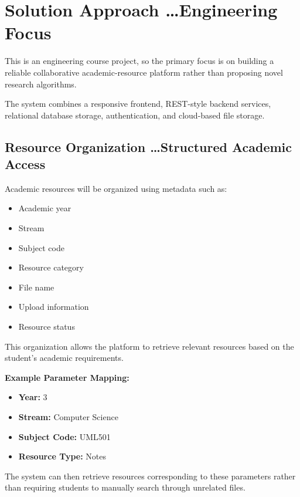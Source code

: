 \documentclass[11pt,a4paper]{article}
\begin{document}
\section{Solution Approach \dots Engineering Focus}
This is an engineering course project, so the primary focus is on building a reliable collaborative academic-resource platform rather than proposing novel research algorithms.

The system combines a responsive frontend, REST-style backend services, relational database storage, authentication, and cloud-based file storage.

\subsection{Resource Organization \dots Structured Academic Access}
Academic resources will be organized using metadata such as:
\begin{itemize}[leftmargin=*]
    \item Academic year
    \item Stream
    \item Subject code
    \item Resource category
    \item File name
    \item Upload information
    \item Resource status
\end{itemize}

This organization allows the platform to retrieve relevant resources based on the student's academic requirements.

\textbf{Example Parameter Mapping:}
\begin{itemize}[leftmargin=*]
    \item \textbf{Year:} 3
    \item \textbf{Stream:} Computer Science
    \item \textbf{Subject Code:} UML501
    \item \textbf{Resource Type:} Notes
\end{itemize}

The system can then retrieve resources corresponding to these parameters rather than requiring students to manually search through unrelated files.
\end{document}
